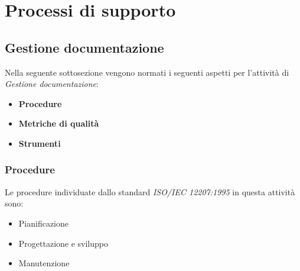 \section{Processi di supporto}
\subsection{Gestione documentazione}
Nella seguente sottosezione vengono normati i seguenti aspetti per l'attività di \textit{Gestione documentazione}:
\begin{itemize}
    \item \textbf{Procedure}
    \item \textbf{Metriche di qualità}
    \item \textbf{Strumenti}
\end{itemize}

\subsubsection{Procedure}
Le procedure individuate dallo standard \textit{ISO/IEC 12207:1995} in questa attività sono:
\begin{itemize}
    \item Pianificazione
    \item Progettazione e sviluppo
    \item Manutenzione
\end{itemize}


